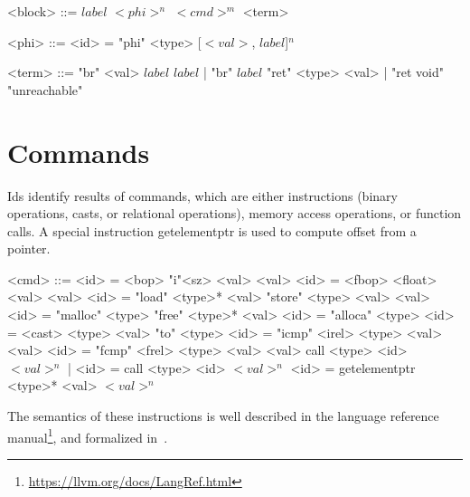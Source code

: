 \begin{grammar}

<block> ::= $label$ $<phi>^n$ $<cmd>^m$ <term>

<phi> ::= <id> = "phi" <type> [$<val>$, $label$]$^n$

<term> ::= "br" <val> $label$ $label$  | "br" $label$
    \alt "ret" <type> <val> | "ret void"
    \alt "unreachable"
\end{grammar}

\section*{Commands}

Ids identify results of \llvm commands, which are either \ssa instructions
(binary operations, casts, or relational operations), memory access operations, or
function calls. A special instruction getelementptr is used to compute offset
from a pointer.

\begin{grammar}
<cmd> ::= <id> = <bop> "i"<sz> <val> <val>
    \alt <id> = <fbop> <float> <val> <val>
    \alt <id> = "load" <type>* <val>
    \alt "store" <type> <val> <val>
    \alt <id> = "malloc" <type>
    \alt "free" <type>* <val>
    \alt <id> = "alloca" <type>
    \alt <id> = <cast> <type> <val> "to" <type>
    \alt <id> = "icmp" <irel> <type> <val> <val>
    \alt <id> = "fcmp" <frel> <type> <val> <val>
    \alt call <type> <id> $<val>^n$ | <id> = call <type> <id> $<val>^n$
    \alt <id> = getelementptr <type>* <val> $<val>^n$
\end{grammar}

\noindent
The semantics of these instructions is well described in the \llvm language
reference manual\footnote{\url{https://llvm.org/docs/LangRef.html}}, and formalized in~\cite{Zhao2012}.
